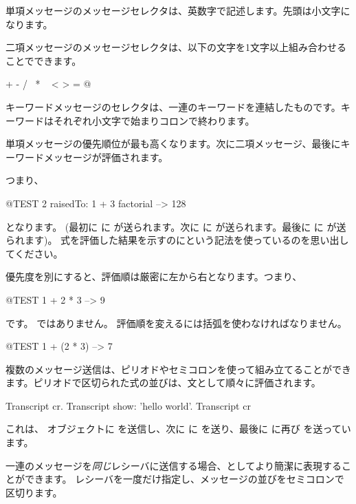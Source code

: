 \documentclass[a4paper,10pt,twoside]{book}
\begin{document}
単項メッセージのメッセージセレクタは、英数字で記述します。先頭は小文字になります。

二項メッセージのメッセージセレクタは、以下の文字を1文字以上組み合わせることでできます。
\begin{code}{}
+ - / \ * ~ < > = @ %
\end{code}
\noindent
キーワードメッセージのセレクタは、一連のキーワードを連結したものです。キーワードはそれぞれ小文字で始まりコロンで終わります。

単項メッセージの優先順位が最も高くなります。次に二項メッセージ、最後にキーワードメッセージが評価されます。

つまり、
\begin{code}{@TEST}
2 raisedTo: 1 + 3 factorial --> 128
\end{code}
となります。
(最初に  に  が送られます。次に  に  が送られます。最後に  に  が送られます)。
式を評価した結果を示すのに\ct{-->}という記法を使っているのを思い出してください。

優先度を別にすると、評価順は厳密に左から右となります。つまり、
\begin{code}{@TEST}
1 + 2 * 3 --> 9
\end{code}
です。 ではありません。
評価順を変えるには括弧を使わなければなりません。
\begin{code}{@TEST}
1 + (2 * 3) --> 7
\end{code}

複数のメッセージ送信は、ピリオドやセミコロンを使って組み立てることができます。ピリオドで区切られた式の並びは、文として順々に評価されます。

\begin{code}{}
Transcript cr.
Transcript show: 'hello world'.
Transcript cr
\end{code}

\noindent
これは、 オブジェクトに  を送信し、次に  に  を送り、最後に  に再び  を送っています。

一連のメッセージを\emph{同じ}レシーバに送信する場合、としてより簡潔に表現することができます。
レシーバを一度だけ指定し、メッセージの並びをセミコロンで区切ります。
\end{document}

